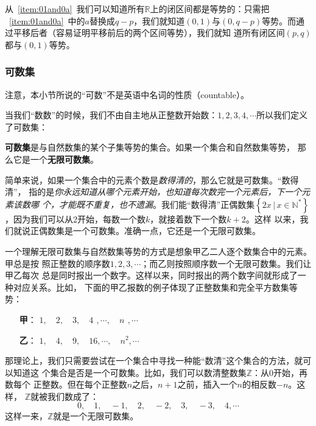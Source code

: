 从~\ref{item:01and0a}~我们可以知道所有$\mathbb{R}$上的闭区间都是等势的：只需把%
~\ref{item:01and0a}~中的$a$替换成$q-p$，我们就知道$\left( 0,1 \right) $与$\left( 
0,q-p \right) $等势。而通过平移后者（容易证明平移前后的两个区间等势），我们就知
道所有闭区间$\left( p,q\right) $都与$\left( 0,1 \right) $等势。

\subsubsection{可数集}

注意，本小节所说的“可数”不是英语中名词的性质（countable）。

当我们“数数”的时候，我们不由自主地从正整数开始数：$1,2,3,4,\cdots $所以我们定义
了可数集：

\begin{rawdef}[可数集]
    \textbf{可数集}是与自然数集的某个子集等势的集合。如果一个集合和自然数集等势，
    那么它是一个\textbf{无限可数集}。
\end{rawdef}

简单来说，如果一个集合中的元素个数是\emph{数得清的}，那么它就是可数集。“数得清”，
指的是\emph{你永远知道从哪个元素开始，也知道每次数完一个元素后，下一个元素该数哪
个，才能既不重复，也不遗漏}。我们能“数得清”正偶数集$\left\{ 2x\,|\,x\in\mathbb{N}
^\ast\right\} $，因为我们可以从2开始，每数一个数$k$，就接着数下一个数$k+2$。这样
以来，我们就说正偶数集是一个可数集。准确一点，它还是一个无限可数集。

一个理解无限可数集与自然数集等势的方式是想象甲乙二人逐个数集合中的元素。甲总是按
照正整数的顺序数$1,2,3,\cdots $；而乙则按照顺序数一个无限可数集。我们让甲乙每次
总是同时报出一个数字。这样以来，同时报出的两个数字间就形成了一种对应关系。比如，
下面的甲乙报数的例子体现了正整数集和完全平方数集等势：

\vspace{2ex}
\begin{minipage}{20em}
    \begin{itemize}
        \item[\textbf{甲}：] $1,\quad 2,\quad 3,\quad 4\,\ , \cdots,\quad n\,\ , \cdots$
        \item[\textbf{乙}：] $1,\quad 4,\quad 9,\quad 16, \cdots,\quad n^2, \cdots$
    \end{itemize}
\end{minipage}
\vspace{2ex}

那理论上，我们只需要尝试在一个集合中寻找一种能“数清”这个集合的方法，就可以知道这
个集合是否是一个可数集。比如，我们可以数清整数集$\mathbb{Z}$：从0开始，再数每个
正整数。但在每个正整数$n$之后，$n+1$之前，插入一个$n$的相反数$-n$。这样，
$\mathbb{Z}$就被我们数成了：
\[
    0,\quad 1,\quad -1,\quad 2,\quad -2,\quad 3,\quad -3,\quad 4,\cdots
\]
这样一来，$\mathbb{Z}$就是一个无限可数集。

